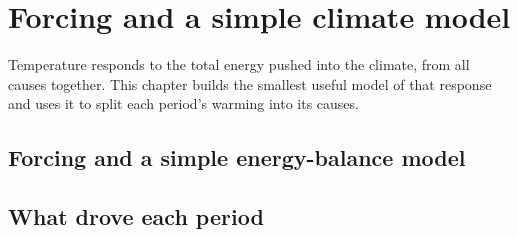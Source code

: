 \chapter{Forcing and a simple climate model}\label{ch:physics}
Temperature responds to the total energy pushed into the climate, from all causes together. This chapter builds the smallest useful model of that response and uses it to split each period's warming into its causes.

\section{Forcing and a simple energy-balance model}

\section{What drove each period}

